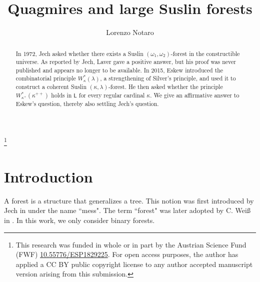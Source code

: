 \documentclass[]{amsart}
\theoremstyle{definition}
\theoremstyle{remark}
\begin{document}
\title{Quagmires and large Suslin forests}

\author{Lorenzo Notaro}
\address{University of Vienna, Institute of Mathematics, Kurt G\"{o}del Research Center, Kolingasse 14-16, 1090 Vienna, Austria}
\curraddr{}

\begin{abstract}
In 1972, Jech asked whether there exists a Suslin $(\omega_1, \omega_2)$-forest in the constructible universe. As reported by Jech, Laver gave a positive answer, but his proof was never published and appears no longer to be available. In 2015, Eskew introduced the combinatorial principle $W^*_\kappa(\lambda)$, a strengthening of Silver's principle, and used it to construct a coherent Suslin $(\kappa, \lambda)$-forest. He then asked whether the principle $W^*_{\kappa^+}(\kappa^{++})$ holds in $\mathsf{L}$ for every regular cardinal $\kappa$. We give an affirmative answer to Eskew's question, thereby also settling Jech's question.
\end{abstract}

\thanks{This research was funded in whole or in part by the Austrian Science Fund (FWF) \href{https://www.fwf.ac.at/en/research-radar/10.55776/ESP1829225}{10.55776/ESP1829225}. For open access purposes, the author has applied a CC BY public copyright license to any author accepted manuscript version arising from this submission.}
%
%
\maketitle


\section{Introduction}

A forest is a structure that generalizes a tree. This notion was first introduced by Jech in \cite{MR325397} under the name  ``mess". The term ``forest" was later adopted by C. Wei{\ss} in \cite{Weiss2010}. In this work, we only consider binary forests.
\end{document}
